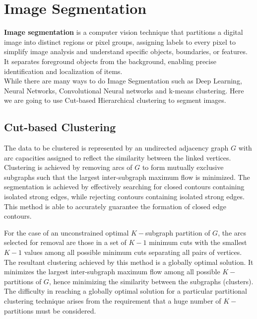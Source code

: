 \chapter{Image Segmentation}
    \textbf{Image segmentation} is a computer vision technique that partitions a digital image into distinct regions or pixel groups, assigning labels to every pixel to simplify image analysis and understand specific objects, boundaries, or features. It separates foreground objects from the background, enabling precise identification and localization of items. \\
    While there are many ways to do Image Segmentation such as Deep Learning, Neural Networks, Convolutional Neural networks and k-means clustering. Here we are going to use Cut-based Hierarchical clustering to segment images. 

    \section{Cut-based Clustering}
        The data to be clustered is represented by an undirected adjacency graph $G$ with arc capacities assigned to reflect the similarity between the linked vertices. Clustering is achieved by removing arcs of $G$ to form mutually exclusive subgraphs such that the largest inter-subgraph maximum flow is minimized. The segmentation is achieved by effectively searching for closed contours containing isolated strong edges, while rejecting contours containing isolated strong edges. This method is able to accurately guarantee the formation of closed edge contours.
        
        For the case of an unconstrained optimal $K-$subgraph partition of $G$, the arcs selected for removal are those in a set of $K-1$ minimum cuts with the smallest $K-1$ values among all possible minimum cuts separating all pairs of vertices. The resultant clustering achieved by this method is a globally optimal solution. It minimizes the largest inter-subgraph maximum flow among all possible $K-$partitions of $G$, hence minimizing the similarity between the subgraphs (clusters). The difficulty in reaching a globally optimal solution for a particular partitional clustering technique arises from the requirement that a huge number of $K-$ partitions must be considered.

